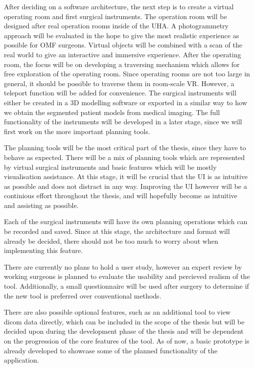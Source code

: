 After deciding on a software architecture, the next step is to create a virtual operating room and first surgical instruments.
The operation room will be designed after real operation rooms inside of the UHA.
A photogrammetry approach will be evaluated in the hope to give the most realistic experience as possible for OMF surgeons.
Virtual objects will be combined with a scan of the real world to give an interactive and immersive experience.
After the operating room, the focus will be on developing a traversing mechanism which allows for free exploration of the operating room.
Since operating rooms are not too large in general, it should be possible to traverse them in room-scale VR.
However, a teleport function will be added for convenience.
The surgical instruments will either be created in a 3D modelling software or exported in a similar way to how we obtain the segmented patient models from medical imaging.
The full functionality of the instruments will be developed in a later stage, since we will first work on the more important planning tools.

The planning tools will be the most critical part of the thesis, since they have to behave as expected.
There will be a mix of planning tools which are represented by virtual surgical instruments and basic features which will be mostly visualisation assistance.
At this stage, it will be crucial that the UI is as intuitive as possible and does not distract in any way.
Improving the UI however will be a continious effort throughout the thesis, and will hopefully become as intuitive and assisting as possible.

Each of the surgical instruments will have its own planning operations which can be recorded and saved.
Since at this stage, the architecture and format will already be decided, there should not be too much to worry about when implementing this feature.

There are currently no plans to hold a user study, however an expert review by working surgeons is planned to evaluate the usability and percieved realism of the tool.
Additionally, a small questionnaire will be used after surgery to determine if the new tool is preferred over conventional methods.

There are also possible optional features, such as an additional tool to view dicom data directly, which can be included in the scope of the thesis but will be decided upon during the development phase of the thesis and will be dependent on the progression of the core features of the tool.
As of now, a basic prototype is already developed to showcase some of the planned functionality of the application.





